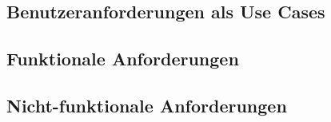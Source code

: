 \documentclass[../main.tex]{subfiles}
\begin{document}
\subsection{Benutzeranforderungen als Use Cases} %

\subsection{Funktionale Anforderungen} %

\subsection{Nicht-funktionale Anforderungen} %
\end{document}
